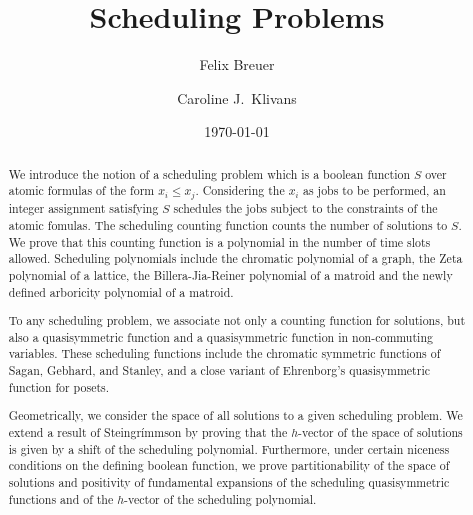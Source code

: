 \documentclass[12pt,reqno]{amsart}
\numberwithin{definition}{section}
\theoremstyle{definition}
\begin{document}
\title{Scheduling Problems}
\author{Felix Breuer}
\address{Research Institue for Symbolic Computation \\ Johannes Kepler University Linz}
\author{Caroline J.\ Klivans}
\address{Departments of Applied Mathematics and Computer Science \\Brown University}
\date{\today}



\begin{abstract} We introduce the notion of a scheduling problem which is a boolean function $S$ over atomic formulas of the form $x_i \leq x_j$.  Considering the $x_i$ as jobs to be performed, an integer assignment satisfying $S$ schedules the jobs subject to the constraints of the atomic fomulas.  The scheduling counting function counts the number of solutions to $S$. We prove that this counting function is a polynomial in the number of time slots allowed. 
 Scheduling polynomials include the chromatic polynomial of a graph, the Zeta polynomial of a lattice, the Billera-Jia-Reiner polynomial of a matroid and the newly defined arboricity polynomial of a matroid. 

To any scheduling problem, we associate not only a counting function for solutions, but also a quasisymmetric function and a quasisymmetric function in non-commuting variables. These scheduling functions include the chromatic symmetric functions of Sagan, Gebhard, and Stanley, and a close variant of  Ehrenborg's quasisymmetric function for posets.  


Geometrically, we consider the space of all solutions to a given scheduling problem.
We extend a result of Steingr\'{i}mmson by proving that the $h$-vector of the space of solutions is given by a shift of the scheduling polynomial.  Furthermore, under certain niceness conditions on the defining boolean function, we prove partitionability of the space of solutions and positivity of fundamental expansions of the scheduling quasisymmetric functions and of the $h$-vector of the scheduling polynomial.  



\end{abstract}
\maketitle
\end{document}
